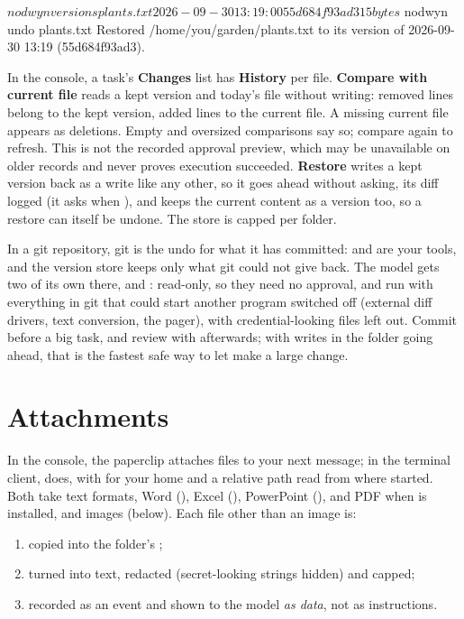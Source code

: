 \begin{sh}
$ nodwyn versions plants.txt
2026-09-30 13:19:00  55d684f93ad3      15 bytes
$ nodwyn undo plants.txt
Restored /home/you/garden/plants.txt to its version of 2026-09-30 13:19 (55d684f93ad3).
\end{sh}

In the console, a task's \textbf{Changes} list has \textbf{History} per
file. \textbf{Compare with current file} reads a kept version and today's
file without writing: removed lines belong to the kept version, added lines
to the current file. A missing current file appears as deletions. Empty and
oversized comparisons say so; compare again to refresh. This is not the
recorded approval preview, which may be unavailable on older records and
never proves execution succeeded. \textbf{Restore} writes a kept version back as a write like any
other, so it goes ahead without asking, its diff logged (it asks when
), and keeps the current content as a
version too, so a restore can itself be undone. The store is capped per
folder.

\begin{tip}
In a git repository, git is the undo for what it has committed:
 and  are your tools, and the version
store keeps only what git could not give back. The model gets two of its
own there,  and : read-only, so they need
no approval, and run with everything in git that could start another
program switched off (external diff drivers, text conversion, the pager),
with credential-looking files left out. Commit before a big task, and
review with  afterwards; with writes in the folder going
ahead, that is the fastest safe way to let \nodwyn{} make a large change.
\end{tip}

\section{Attachments}

In the console, the paperclip attaches files to your next message; in the
terminal client,  does, with \code{\textasciitilde/} for
your home and a relative path read from where \nodwyn{} started. Both take
text formats, Word (), Excel (), PowerPoint
(), and PDF when  is installed, and images
(below). Each file other than an image is:

\begin{enumerate}
  \item copied into the folder's ;
  \item turned into text, redacted (secret-looking strings hidden) and
    capped;
  \item recorded as an  event and shown to the model
    \emph{as data}, not as instructions.
\end{enumerate}

